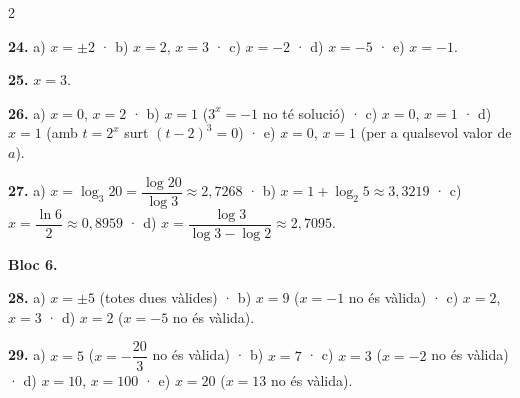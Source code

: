 \documentclass[13pt,a4paper]{extarticle}
\begin{document}
\begin{multicols}{2}
\par\noindent\begin{minipage}{\linewidth}
\textbf{24.} a) $x=\pm2$ · b) $x=2$, $x=3$ · c) $x=-2$ · d) $x=-5$ · e) $x=-1$.\par
\end{minipage}\par\vspace{1.6mm}
\par\noindent\begin{minipage}{\linewidth}
\textbf{25.} $x=3$.\par
\end{minipage}\par\vspace{1.6mm}
\par\noindent\begin{minipage}{\linewidth}
\textbf{26.} a) $x=0$, $x=2$ · b) $x=1$ ($3^x=-1$ no té solució) · c) $x=0$, $x=1$ · d) $x=1$ (amb $t=2^x$ surt $(t-2)^3=0$) · e) $x=0$, $x=1$ (per a qualsevol valor de $a$).\par
\end{minipage}\par\vspace{1.6mm}
\par\noindent\begin{minipage}{\linewidth}
\textbf{27.} a) $x=\log_3 20=\dfrac{\log 20}{\log 3}\approx 2{,}7268$ · b) $x=1+\log_2 5\approx 3{,}3219$ · c) $x=\dfrac{\ln 6}{2}\approx 0{,}8959$ · d) $x=\dfrac{\log 3}{\log 3-\log 2}\approx 2{,}7095$.\par
\end{minipage}\par\vspace{1.6mm}
\textbf{Bloc 6.}\par
\par\noindent\begin{minipage}{\linewidth}
\textbf{28.} a) $x=\pm5$ (totes dues vàlides) · b) $x=9$ ($x=-1$ no és vàlida) · c) $x=2$, $x=3$ · d) $x=2$ ($x=-5$ no és vàlida).\par
\end{minipage}\par\vspace{1.6mm}
\par\noindent\begin{minipage}{\linewidth}
\textbf{29.} a) $x=5$ ($x=-\dfrac{20}{3}$ no és vàlida) · b) $x=7$ · c) $x=3$ ($x=-2$ no és vàlida) · d) $x=10$, $x=100$ · e) $x=20$ ($x=13$ no és vàlida).\par
\end{minipage}\par\vspace{1.6mm}

\end{multicols}
\end{document}
